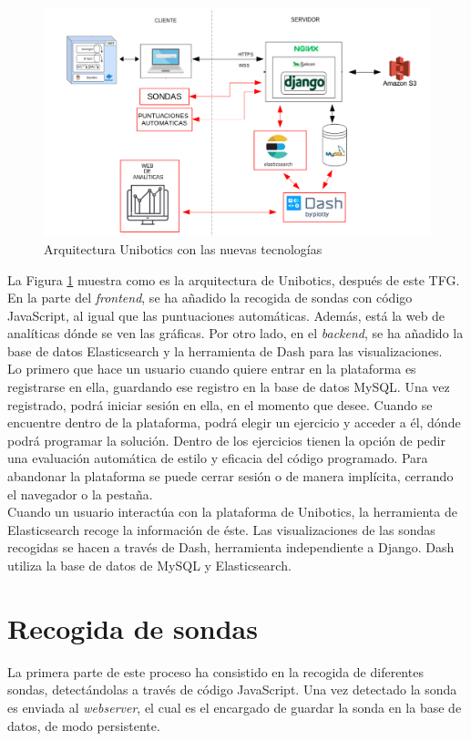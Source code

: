 \begin{figure}[H]
    \centering
    \includegraphics[width=15cm, keepaspectratio]{img/grafico2.png}
    \caption{Arquitectura Unibotics con las nuevas tecnologías}
    \label{fig:grafico2}
\end{figure}
La Figura \ref{fig:grafico2} muestra como es la arquitectura de Unibotics, después de este TFG. En la parte del \textit{frontend}, se ha añadido la recogida de sondas con código JavaScript, al igual que las puntuaciones automáticas. Además, está la web de analíticas dónde se ven las gráficas. Por otro lado, en el \textit{backend}, se ha añadido la base de datos Elasticsearch y la herramienta de Dash para las visualizaciones.\\

Lo primero que hace un usuario cuando quiere entrar en la plataforma es registrarse en ella, guardando ese registro en la base de datos MySQL. Una vez registrado, podrá iniciar sesión en ella, en el momento que desee. Cuando se encuentre dentro de la plataforma, podrá elegir un ejercicio y acceder a él, dónde podrá programar la solución. Dentro de los ejercicios tienen la opción de pedir una evaluación automática de estilo y eficacia del código programado. Para abandonar la plataforma se puede cerrar sesión o de manera implícita, cerrando el navegador o la pestaña.\\

Cuando un usuario interactúa con la plataforma de Unibotics, la herramienta de Elasticsearch recoge la información de éste. Las visualizaciones de las sondas recogidas se hacen a través de Dash, herramienta independiente a Django. Dash utiliza la base de datos de MySQL y Elasticsearch.\\
\section{Recogida de sondas}
La primera parte de este proceso ha consistido en la recogida de diferentes sondas, detectándolas a través de código JavaScript. Una vez detectado la sonda es enviada al \textit{webserver}, el cual es el encargado de guardar la sonda en la base de datos, de modo persistente.\\

